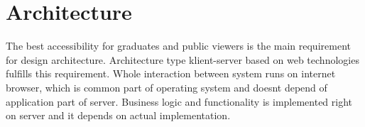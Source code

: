 \documentclass{iitsrc}[2006/14/02]
\begin{document}
\section{Architecture}


The best accessibility for graduates and public viewers is the main requirement for design architecture. Architecture type klient-server based on web technologies fulfills this requirement. Whole interaction between system runs on internet browser, which is common part of operating system and doesnt depend of application part of server. Business logic and functionality is implemented right on server and it depends on actual implementation.
\end{document}
